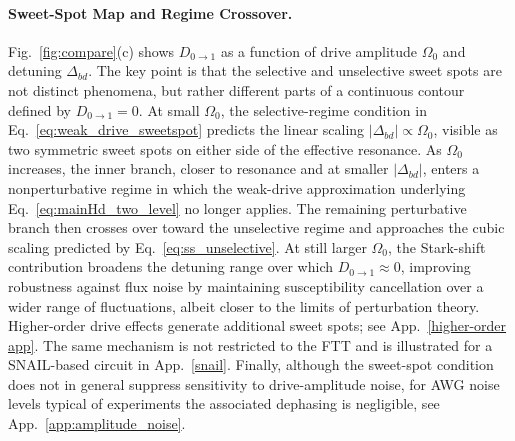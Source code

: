 \paragraph{Sweet-Spot Map and Regime Crossover.}
Fig.~\ref{fig:compare}(c) shows \(D_{0\rightarrow 1}\) as a function of drive amplitude \(\Omega_0\) and detuning \(\Delta_{bd}\). The key point is that the selective and unselective sweet spots are not distinct phenomena, but rather different parts of a continuous contour defined by \(D_{0\rightarrow 1}=0\). At small \(\Omega_0\), the selective-regime condition in Eq.~\eqref{eq:weak_drive_sweetspot} predicts the linear scaling \(|\Delta_{bd}| \propto \Omega_0\), visible as two symmetric sweet spots on either side of the effective resonance. As \(\Omega_0\) increases, the inner branch, closer to resonance and at smaller \(|\Delta_{bd}|\), enters a nonperturbative regime in which the weak-drive approximation underlying Eq.~\eqref{eq:mainHd_two_level} no longer applies. The remaining perturbative branch then crosses over toward the unselective regime and approaches the cubic scaling predicted by Eq.~\eqref{eq:ss_unselective}. At still larger \(\Omega_0\), the Stark-shift contribution broadens the detuning range over which \(D_{0\rightarrow 1}\approx 0\), improving robustness against flux noise by maintaining susceptibility cancellation over a wider range of fluctuations, albeit closer to the limits of perturbation theory. Higher-order drive effects generate additional sweet spots; see App.~\ref{higher-order app}. The same mechanism is not restricted to the FTT and is illustrated for a SNAIL-based circuit in App.~\ref{snail}. Finally, although the sweet-spot condition does not in general suppress sensitivity to drive-amplitude noise, for AWG noise levels typical of experiments the associated dephasing is negligible, see App.~\ref{app:amplitude_noise}.





